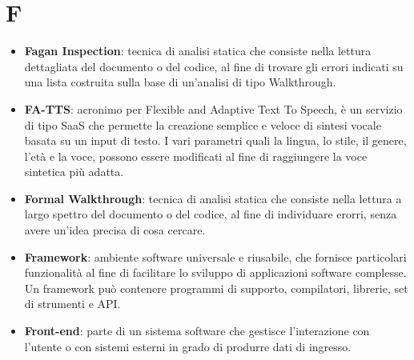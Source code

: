 \newpage
\section{F}

\begin{itemize}
	\item \textbf{Fagan Inspection}: tecnica di analisi statica che consiste nella lettura dettagliata del documento o del codice, al fine di trovare gli errori indicati su una lista costruita sulla base di un'analisi di tipo Walkthrough.
	\item \textbf{FA-TTS}: acronimo per Flexible and Adaptive Text To Speech, è un servizio di tipo SaaS che permette la creazione semplice e veloce di sintesi vocale basata su un input di testo. I vari parametri quali la lingua, lo stile, il genere, l'età e la voce, possono essere modificati al fine di raggiungere la voce sintetica più adatta.
	\item \textbf{Formal Walkthrough}: tecnica di analisi statica che consiste nella lettura a largo spettro del documento o del codice, al fine di individuare erorri, senza avere un'idea precisa di cosa cercare.
	\item \textbf{Framework}: ambiente software universale e riusabile, che fornisce particolari funzionalità al fine di facilitare lo sviluppo di applicazioni software complesse. Un framework può contenere programmi di supporto, compilatori, librerie, set di strumenti e API.
	\item \textbf{Front-end}: parte di un sistema software che gestisce l'interazione con l'utente o con sistemi esterni in grado di produrre dati di ingresso.
\end{itemize}
